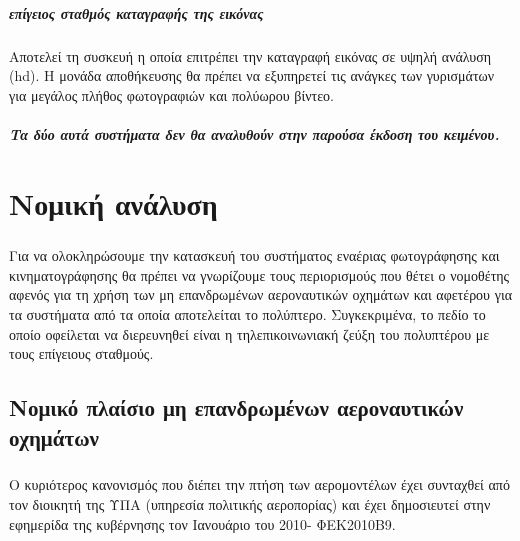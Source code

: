 \documentclass[a4paper, 12pt, twoside]{report}
\begin{document}
{{{{{{			\paragraph{επίγειος σταθμός καταγραφής της εικόνας}{Αποτελεί τη συσκευή η οποία επιτρέπει την καταγραφή εικόνας σε υψηλή ανάλυση (hd). Η μονάδα αποθήκευσης θα πρέπει να εξυπηρετεί τις ανάγκες των γυρισμάτων για μεγάλος πλήθος φωτογραφιών και πολύωρου βίντεο.
			}
			\paragraph{Τα δύο αυτά συστήματα δεν θα αναλυθούν στην παρούσα έκδοση του κειμένου.}
	
	\chapter{Νομική ανάλυση}
		
		\paragraph{}{Για να ολοκληρώσουμε την κατασκευή του συστήματος εναέριας φωτογράφησης και κινηματογράφησης θα πρέπει να γνωρίζουμε τους περιορισμούς που θέτει ο νομοθέτης αφενός για τη χρήση των μη επανδρωμένων αεροναυτικών οχημάτων και αφετέρου για τα συστήματα από τα οποία αποτελείται το πολύπτερο. Συγκεκριμένα, το πεδίο το οποίο οφείλεται να διερευνηθεί είναι η τηλεπικοινωνιακή ζεύξη του πολυπτέρου με τους επίγειους σταθμούς. 
			}
			
		\section{Νομικό πλαίσιο μη επανδρωμένων αεροναυτικών οχημάτων}
			
			\paragraph{}{Ο κυριότερος κανονισμός που διέπει την πτήση των αερομοντέλων έχει συνταχθεί από τον διοικητή της ΥΠΑ (υπηρεσία πολιτικής αεροπορίας) και έχει δημοσιευτεί στην εφημερίδα της κυβέρνησης τον Ιανουάριο του 2010- ΦΕΚ2010Β9.
			}
}}}}}}
\end{document}
